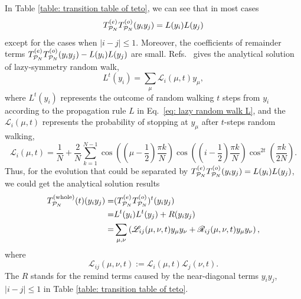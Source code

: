 \documentclass{article}
\newcommand{\Twhole}{T^{(\text{whole})}}
\begin{document}
In Table \ref{table: transition table of teto}, we can see that in most cases 
\begin{equation}
    T^{(e)}_{\mathcal{P}_N}T^{(o)}_{\mathcal{P}_N}(y_i y_j) = L(y_i) L(y_j)
\end{equation}
except for the cases when $|i-j|\leq 1$. 
Moreover, the coefficients of remainder terms $T^{(e)}_{\mathcal{P}_N}T^{(o)}_{\mathcal{P}_N}(y_i y_j) - L(y_i)L(y_j)$ are small. Refs.~\cite{giuggioli2020exact} gives the analytical solution of lazy-symmetry random walk,
\begin{equation}
     L^t(y_i) = \sum_\mu \mathcal{L}_{i}(\mu, t) y_\mu,
\end{equation}
where $L^t(y_i)$ represents the outcome of random walking $t$ steps from $y_i$ according to the propagation rule $L$ in Eq.~\eqref{eq: lazy random walk L}, and the $\mathcal{L}_{i}(\mu, t)$ represents the probability of stopping at $y_\mu$ after $t$-steps random walking,
\begin{equation}
    \mathcal{L}_{i}(\mu, t) = \frac{1}{N} + \frac{2}{N} \sum_{k=1}^{N-1} \cos \left(\left(\mu-\frac{1}{2}\right) \frac{\pi k}{N}\right) \cos \left(\left(i-\frac{1}{2}\right) \frac{\pi k}{N}\right) \cos^{2 t} \left(\frac{\pi k}{2 N}\right).
\end{equation}
Thus, for the evolution that could be separated by $T^{(e)}_{\mathcal{P}_N}T^{(o)}_{\mathcal{P}_N}(y_iy_j) = L(y_i) L(y_j)$, we could get the analytical solution results
\begin{align}
    \Twhole_{\mathcal{P}_N} (t) (y_i y_j) =& (\teto)^t (y_i y_j) \\
    =& L^t(y_i)L^t(y_j) + R(y_iy_j)\\
    \label{eq: zz anonymous 7}
    =&\sum_{\mu,\nu} \left(\mathscr{L}_{ij} (\mu, \nu, t) y_\mu y_\nu + \mathscr{R}_{ij} (\mu, \nu, t) y_\mu y_\nu\right),
\end{align}
where
\begin{equation}
    \mathscr{L}_{ij} (\mu, \nu, t) := \mathcal{L}_{i}(\mu, t)\mathcal{L}_{j}(\nu, t).
\end{equation}
The $R$ stands for the remind terms caused by the near-diagonal terms $y_i y_j$, $|i-j| \leq 1$ in Table \ref{table: transition table of teto}. 
\end{document}
